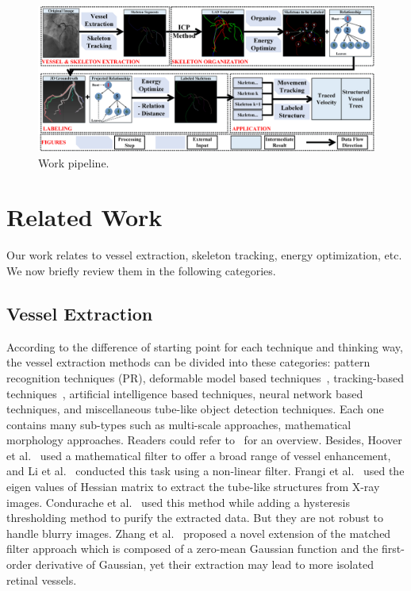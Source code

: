 \documentclass[journal]{IEEEtran}
\begin{document}
\begin{figure}[!t]
\centering
\includegraphics[width=1.0\linewidth]{./images/pipeline.png}
\caption{Work pipeline.}
\label{fig:pipeline}
\end{figure}

\section{Related Work}
\label{sec:related-work}
Our work relates to vessel extraction, skeleton tracking, energy optimization, etc. We now briefly review them in the following categories.

\subsection{Vessel Extraction}
According to the difference of starting point for each technique and thinking way, the vessel extraction methods can be divided into these categories: pattern recognition techniques (PR), deformable model based techniques~\cite{Deformable2}\cite{Deformable3}, tracking-based techniques~\cite{Tracking2}\cite{Tracking3}\cite{Tracking5}, artificial intelligence based techniques, neural network based techniques, and miscellaneous tube-like object detection techniques. Each one contains many sub-types such as multi-scale approaches, mathematical morphology approaches. Readers could refer to~\cite{Kirbas} for an overview. Besides, Hoover et al.~\cite{Hoover} used a mathematical filter to offer a broad range of vessel enhancement, and Li et al.~\cite{Li} conducted this task using a non-linear filter. Frangi et al.~\cite{Frangi} used the eigen values of Hessian matrix to extract the tube-like structures from X-ray images. Condurache et al.~\cite{Condurache} used this method while adding a hysteresis thresholding method to purify the extracted data. But they are not robust to handle blurry images. Zhang et al.~\cite{Zhang2010438} proposed a novel extension of the matched filter approach which is composed of a zero-mean Gaussian function and the first-order derivative of Gaussian, yet their extraction may lead to more isolated retinal vessels.
\end{document}
